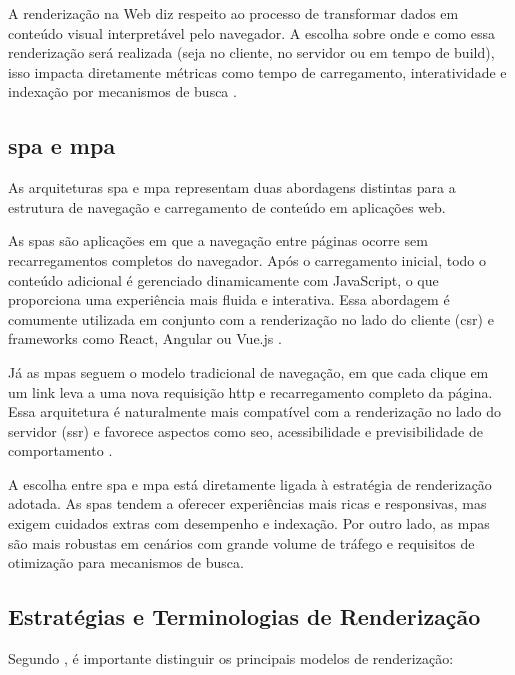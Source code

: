 A renderização na Web diz respeito ao processo de transformar dados em conteúdo visual interpretável pelo navegador. A escolha sobre onde e como essa renderização será realizada (seja no cliente, no servidor ou em tempo de build), isso impacta diretamente métricas como tempo de carregamento, interatividade e indexação por mecanismos de busca \cite{osmani2025}.


\subsection{\acrfull{spa} e \acrfull{mpa}}
\label{subsec:spa-mpa}

As arquiteturas \acrfull{spa} e \acrfull{mpa} representam duas abordagens distintas para a estrutura de navegação e carregamento de conteúdo em aplicações web.

As \acrshort{spa}s são aplicações em que a navegação entre páginas ocorre sem recarregamentos completos do navegador. Após o carregamento inicial, todo o conteúdo adicional é gerenciado dinamicamente com JavaScript, o que proporciona uma experiência mais fluida e interativa. Essa abordagem é comumente utilizada em conjunto com a renderização no lado do cliente (\acrshort{csr}) e frameworks como React, Angular ou Vue.js \cite{atori2024}.

Já as \acrshort{mpa}s seguem o modelo tradicional de navegação, em que cada clique em um link leva a uma nova requisição \acrshort{http} e recarregamento completo da página. Essa arquitetura é naturalmente mais compatível com a renderização no lado do servidor (\acrshort{ssr}) e favorece aspectos como \acrshort{seo}, acessibilidade e previsibilidade de comportamento \cite{osmani2025}.

A escolha entre \acrshort{spa} e \acrshort{mpa} está diretamente ligada à estratégia de renderização adotada. As \acrshort{spa}s tendem a oferecer experiências mais ricas e responsivas, mas exigem cuidados extras com desempenho e indexação. Por outro lado, as \acrshort{mpa}s são mais robustas em cenários com grande volume de tráfego e requisitos de otimização para mecanismos de busca.



\subsection{Estratégias e Terminologias de Renderização}
\label{subsec:estrategias-terminologias}

Segundo , é importante distinguir os principais modelos de renderização:


